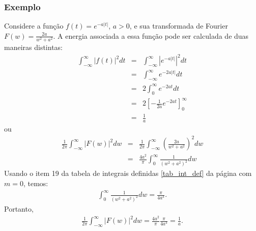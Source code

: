 \documentclass[a4paper,10pt]{book}
\begin{document}
\subsubsection{Exemplo}
Considere a função $f(t)=e^{-a|t|}$, $a>0$, e sua transformada de Fourier $F(w)=\frac{2a}{w^2+a^2}$. A energia associada a essa função pode ser calculada de duas maneiras distintas:
\begin{eqnarray*}
\int_{-\infty}^\infty |f(t)|^2dt&=&\int_{-\infty}^\infty |e^{-a|t|}|^2dt\\
&=&\int_{-\infty}^\infty e^{-2a|t|}dt\\
&=&2\int_{0}^\infty e^{-2a t}dt\\
&=&2\left[-\frac{1}{2a} e^{-2a t}\right]_{0}^\infty\\
&=&\frac{1}{a}
\end{eqnarray*}
ou
\begin{eqnarray*}
\frac{1}{2\pi}\int_{-\infty}^\infty |F(w)|^2dw&=&\frac{1}{2\pi}\int_{-\infty}^\infty \left(\frac{2a}{w^2+a^2}\right)^2dw\\
&=&\frac{4a^2}{\pi}\int_{0}^\infty \frac{1}{\left(w^2+a^2\right)^2}dw
\end{eqnarray*}
Usando o item 19 da tabela de integrais definidas \ref{tab_int_def} da página \pageref{tab_int_def} com $m=0$, temos:
\begin{eqnarray*}
\int_{0}^\infty \frac{1}{\left(w^2+a^2\right)^2}dw=\frac{\pi}{4a^3}.
\end{eqnarray*}
Portanto,
\begin{eqnarray*}
\frac{1}{2\pi}\int_{-\infty}^\infty |F(w)|^2dw=\frac{4a^2}{\pi}\frac{\pi}{4a^3}=\frac{1}{a}.
\end{eqnarray*}

 
\end{document}
